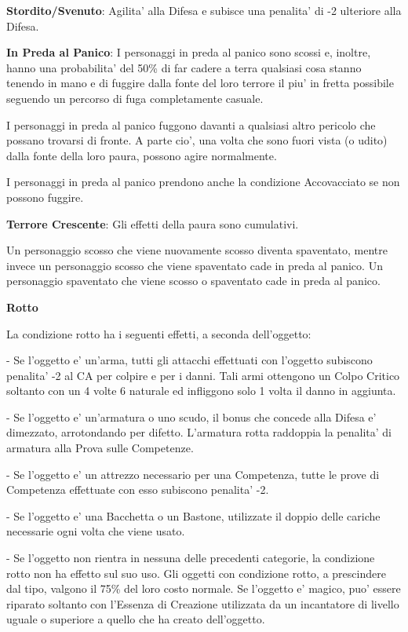 \documentclass[a4paper,11pt,twoside,openany]{book}
\begin{document}
{		\textbf{Stordito/Svenuto}: Agilita' alla Difesa e subisce una penalita' di -2 ulteriore alla Difesa.
		
		\textbf{In Preda al Panico}: I personaggi in preda al panico sono scossi e, inoltre, hanno una probabilita' del 50\% di far cadere a terra qualsiasi cosa stanno tenendo in mano e di fuggire dalla fonte del loro terrore il piu' in fretta possibile seguendo un percorso di fuga completamente casuale.
		
		I personaggi in preda al panico fuggono davanti a qualsiasi altro pericolo che possano trovarsi di fronte. A parte cio', una volta che sono fuori vista (o udito) dalla fonte della loro paura, possono agire normalmente.
		
		I personaggi in preda al panico prendono anche la condizione Accovacciato se non possono fuggire.
		
		\textbf{Terrore Crescente}: Gli effetti della paura sono cumulativi.
		
		Un personaggio scosso che viene nuovamente scosso diventa spaventato, mentre invece un personaggio scosso che viene spaventato cade in preda al panico. Un personaggio spaventato che viene scosso o spaventato cade in preda al panico.
		
		\textbf{Rotto}
		
		La condizione rotto ha i seguenti effetti, a seconda dell'oggetto:
		
		- Se l'oggetto e' un'arma, tutti gli attacchi effettuati con l'oggetto
		subiscono penalita' -2 al CA per colpire e per i danni. Tali armi
		ottengono un Colpo Critico soltanto con un 4 volte 6 naturale ed infliggono
		solo 1 volta il danno in aggiunta.
		
		- Se l'oggetto e' un'armatura o uno scudo, il bonus che concede alla
		Difesa e' dimezzato, arrotondando per difetto. L'armatura rotta raddoppia
		la penalita' di armatura alla Prova sulle Competenze.
		
		- Se l'oggetto e' un attrezzo necessario per una Competenza, tutte
		le prove di Competenza effettuate con esso subiscono penalita' -2.
		
		- Se l'oggetto e' una Bacchetta o un Bastone, utilizzate il doppio
		delle cariche necessarie ogni volta che viene usato.
		
		- Se l'oggetto non rientra in nessuna delle precedenti categorie,
		la condizione rotto non ha effetto sul suo uso. Gli oggetti con condizione
		rotto, a prescindere dal tipo, valgono il 75\% del loro costo normale.
		Se l'oggetto e' magico, puo' essere riparato soltanto con l'Essenza
		di Creazione utilizzata da un incantatore di livello uguale o superiore
		a quello che ha creato dell'oggetto.
		
}
\end{document}
